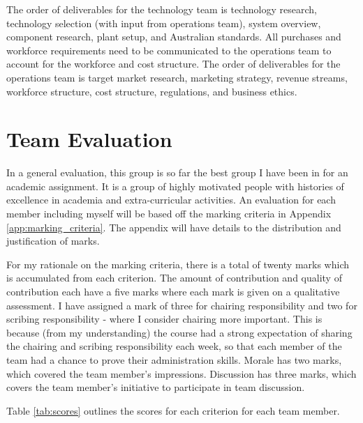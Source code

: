 \documentclass[11pt, a4, nocenter, margin=150mm]{article}
\begin{document}
	The order of deliverables for the technology team is technology research, technology selection (with input from operations team), system overview, component research, plant setup, and Australian standards. All purchases and workforce requirements need to be communicated to the operations team to account for the workforce and cost structure. The order of deliverables for the operations team is target market research, marketing strategy, revenue streams, workforce structure, cost structure, regulations, and business ethics.

\section{Team Evaluation}

	In a general evaluation, this group is so far the best group I have been in for an academic assignment. It is a group of highly motivated people with histories of excellence in academia and extra-curricular activities. An evaluation for each member including myself will be based off the marking criteria in Appendix \ref{app:marking_criteria}. The appendix will have details to the distribution and justification of marks.

	For my rationale on the marking criteria, there is a total of twenty marks which is accumulated from each criterion. The amount of contribution and quality of contribution each have a five marks where each mark is given on a qualitative assessment. I have assigned a mark of three for chairing responsibility and two for scribing responsibility - where I consider chairing more important. This is because (from my understanding) the course had a strong expectation of sharing the chairing and scribing responsibility each week, so that each member of the team had a chance to prove their administration skills. Morale has two marks, which covered the team member's impressions. Discussion has three marks, which covers the team member's initiative to participate in team discussion.

	Table \ref{tab:scores} outlines the scores for each criterion for each team member.
\end{document}
